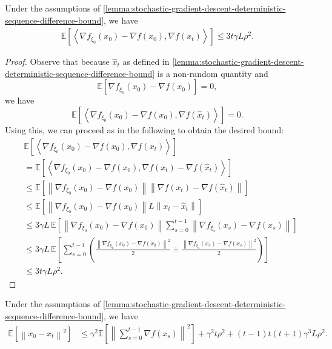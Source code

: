 \documentclass{article}
\newcommand{\inprod}[2]{\left\langle #1,#2 \right\rangle}
\newcommand{\sqnorm}[1]{\left\| #1 \right\|^2}
\newcommand{\norm}[1]{\left\|#1\right\|}
\theoremstyle{plain}
\theoremstyle{remark}
\begin{document}
\begin{lemma}
\label{lemma:stochastic-gradient-descent-inner-product-bound}
Under the assumptions of \cref{lemma:stochastic-gradient-descent-deterministic-sequence-difference-bound}, we have
\begin{align*}
    \mathbb{E} \left[ \inprod{\nabla f_{\xi_0}(x_0) - \nabla f(x_0)}{\nabla f(x_t)} \right] \le 3t\gamma L \rho^2 .
\end{align*}
\end{lemma}

\begin{proof}
Observe that because $\hat{x}_t$ as defined in \cref{lemma:stochastic-gradient-descent-deterministic-sequence-difference-bound} is a non-random quantity and 
\[
    \mathbb{E}\left[ \nabla f_{\xi_0} (x_0) - \nabla f(x_0) \right] = 0 ,
\]
we have
\[
    \mathbb{E} \left[ \inprod{\nabla f_{\xi_0} (x_0) - \nabla f(x_0)}{\nabla f(\hat{x}_t)} \right] = 0.
\]
Using this, we can proceed as in the following to obtain the desired bound:
\begin{align*}
    & \mathbb{E} \left[ \inprod{\nabla f_{\xi_0}(x_0) - \nabla f(x_0)}{\nabla f(x_t)} \right] \\
    & = \mathbb{E} \left[ \inprod{\nabla f_{\xi_0}(x_0) - \nabla f(x_0)}{\nabla f(x_t) - \nabla f(\hat{x}_t)} \right] \\
    & \le \mathbb{E} \left[ \norm{\nabla f_{\xi_0}(x_0) - \nabla f(x_0)} \norm{\nabla f(x_t) - \nabla f(\hat{x}_t)} \right] \\
    & \le \mathbb{E} \left[ \norm{\nabla f_{\xi_0}(x_0) - \nabla f(x_0)} L \norm{x_t - \hat{x}_t} \right] \\
    & \le 3\gamma L \, \mathbb{E} \left[ \norm{\nabla f_{\xi_0}(x_0) - \nabla f(x_0)} \sum_{s=0}^{t-1}  \norm{\nabla f_{\xi_{s}} (x_{s}) - \nabla f(x_{s})} \right] \\
    & \le 3\gamma L \, \mathbb{E}  \left[ \sum_{s=0}^{t-1} \left( \frac{\sqnorm{\nabla f_{\xi_0}(x_0) - \nabla f(x_0)}}{2} + \frac{\sqnorm{\nabla f_{\xi_{s}} (x_{s}) - \nabla f(x_{s})}}{2} \right) \right] \\
    & \le 3t \gamma L \rho^2 .
\end{align*}

\end{proof}

\begin{lemma}
\label{lemma:stochastic-gradient-descent-dist-to-initial-bound}
Under the assumptions of \cref{lemma:stochastic-gradient-descent-deterministic-sequence-difference-bound}, we have
\begin{align*}
    \mathbb{E} \left[ \sqnorm{x_0 - x_t} \right] %
    & \le \gamma^2 \mathbb{E} \left[ \sqnorm{\sum_{s=0}^{t-1} \nabla f(x_s)} \right] + \gamma^2 t \rho^2 + (t-1)t(t+1) \gamma^3 L \rho^2 .
\end{align*}
\end{lemma}
\end{document}
